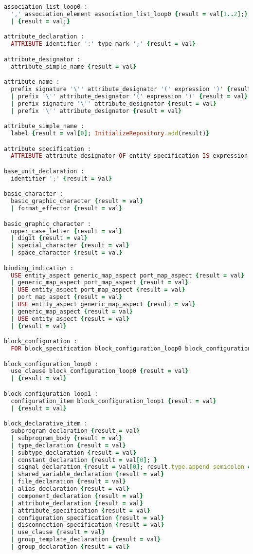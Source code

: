 \begin{lstlisting}[language=Ruby, style=rubystyle]
association_list_loop0 :
  ',' association_element association_list_loop0 {result = val[1..2];}
  | {result = val;}

attribute_declaration :
  ATTRIBUTE identifier ':' type_mark ';' {result = val}

attribute_designator :
  attribute_simple_name {result = val}

attribute_name :
  prefix signature '\'' attribute_designator '(' expression ')' {result = val; }
  | prefix '\'' attribute_designator '(' expression ')' {result = val}
  | prefix signature '\'' attribute_designator {result = val}
  | prefix '\'' attribute_designator {result = val}

attribute_simple_name :
  label {result = val[0]; InitializeRepository.add(result)}

attribute_specification :
  ATTRIBUTE attribute_designator OF entity_specification IS expression ';' {result = val}

base_unit_declaration :
  identifier ';' {result = val}

basic_character :
  basic_graphic_character {result = val}
  | format_effector {result = val}

basic_graphic_character :
  upper_case_letter {result = val}
  | digit {result = val}
  | special_character {result = val}
  | space_character {result = val}

binding_indication :
  USE entity_aspect generic_map_aspect port_map_aspect {result = val}
  | generic_map_aspect port_map_aspect {result = val}
  | USE entity_aspect port_map_aspect {result = val}
  | port_map_aspect {result = val}
  | USE entity_aspect generic_map_aspect {result = val}
  | generic_map_aspect {result = val}
  | USE entity_aspect {result = val}
  | {result = val}

block_configuration :
  FOR block_specification block_configuration_loop0 block_configuration_loop1 END FOR ';' {result = val}

block_configuration_loop0 :
  use_clause block_configuration_loop0 {result = val}
  | {result = val}

block_configuration_loop1 :
  configuration_item block_configuration_loop1 {result = val}
  | {result = val}

block_declarative_item :
  subprogram_declaration {result = val}
  | subprogram_body {result = val}
  | type_declaration {result = val}
  | subtype_declaration {result = val}
  | constant_declaration {result = val[0]; }
  | signal_declaration {result = val[0]; result.type.append_semicolon = true}
  | shared_variable_declaration {result = val}
  | file_declaration {result = val}
  | alias_declaration {result = val}
  | component_declaration {result = val}
  | attribute_declaration {result = val}
  | attribute_specification {result = val}
  | configuration_specification {result = val}
  | disconnection_specification {result = val}
  | use_clause {result = val}
  | group_template_declaration {result = val}
  | group_declaration {result = val}


\end{lstlisting}
